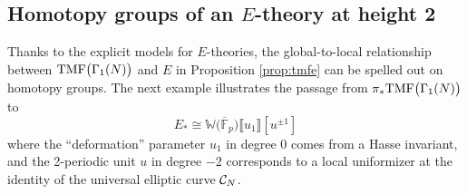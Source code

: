 \documentclass{gtpart}
\theoremstyle{definition}
\theoremstyle{remark}
\newcommand{\mb}[1]{\mathbb{#1}}
\newcommand{\cF}{\overline {\mb F}}
\newcommand{\CC}{{\cal C}}
\newcommand{\BW}{{\mb W}}
\newcommand{\TMF}{{\rm TMF}}
\newcommand{\G}{\Gamma}
\newcommand{\lb}{\llbracket}
\newcommand{\rb}{\rrbracket}
\renewcommand{\=}{\approx}
\renewcommand{\-}{\sim}
\numberwithin{equation}{section}
\numberwithin{thm}{section}
\begin{document}
\subsection{Homotopy groups of an $E$-theory at height 2}
\label{subsec:mfe0}

Thanks to the explicit models for $E$-theories, the global-to-local relationship 
between $\TMF\big(\G_1(N)\big)$ and $E$ in Proposition \ref{prop:tmfe} can be 
spelled out on homotopy groups.  The next example illustrates the passage from 
$\pi_* \TMF\big(\G_1(N)\big)$ to 
\[
 E_* \cong \BW \big( \cF_p \big) \lb u_1 \rb [u^{\pm 1}] 
\]
where the ``deformation'' parameter $u_1$ in degree 0 comes from a Hasse 
invariant, and the 2-periodic unit $u$ in degree $-2$ corresponds to a local 
uniformizer at the identity of the universal elliptic curve $\CC_N$.  
\end{document}
